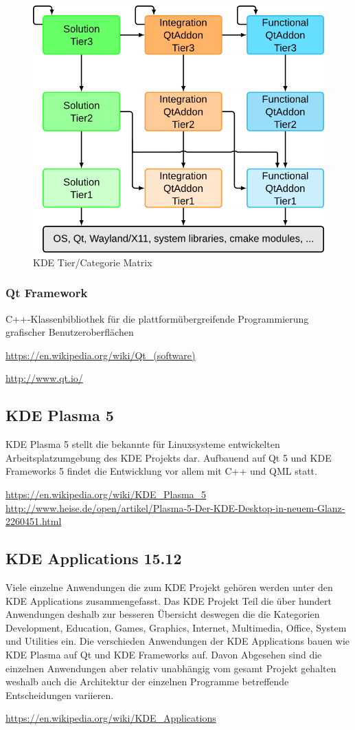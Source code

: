 \begin{figure}[h]
	\centering
	\includegraphics[width=0.9\columnwidth]{images/kf5_no_tier4_big.png}
	\caption{KDE Tier/Categorie Matrix}
	\label{fig:kde_matrix}
\end{figure}


\subsubsection{Qt Framework}
C++-Klassenbibliothek für die plattformübergreifende Programmierung grafischer Benutzeroberflächen

\url{https://en.wikipedia.org/wiki/Qt_(software)}

\url{http://www.qt.io/}

\subsection{KDE Plasma 5}
KDE Plasma 5 stellt die bekannte für Linuxsysteme entwickelten Arbeitsplatzumgebung des KDE Projekts dar. Aufbauend auf Qt 5 und KDE Frameworks 5 findet die Entwicklung vor allem mit C++ und QML statt. 

\url{https://en.wikipedia.org/wiki/KDE_Plasma_5}
\url{http://www.heise.de/open/artikel/Plasma-5-Der-KDE-Desktop-in-neuem-Glanz-2260451.html}

\subsection{KDE Applications 15.12}
Viele einzelne Anwendungen die zum KDE Projekt gehören werden unter den KDE Applications zusammengefasst. Das KDE Projekt Teil die über hundert Anwendungen deshalb zur besseren Übersicht deswegen die die Kategorien Development, Education, Games, Graphics, Internet, Multimedia, Office, System und Utilities ein. Die verschieden Anwendungen der KDE Applications bauen wie KDE Plasma auf Qt und KDE Frameworks auf. Davon Abgesehen sind die einzelnen Anwendungen aber relativ unabhängig vom gesamt Projekt gehalten weshalb auch die Architektur der einzelnen Programme betreffende Entscheidungen variieren. 

\url{https://en.wikipedia.org/wiki/KDE_Applications}

%